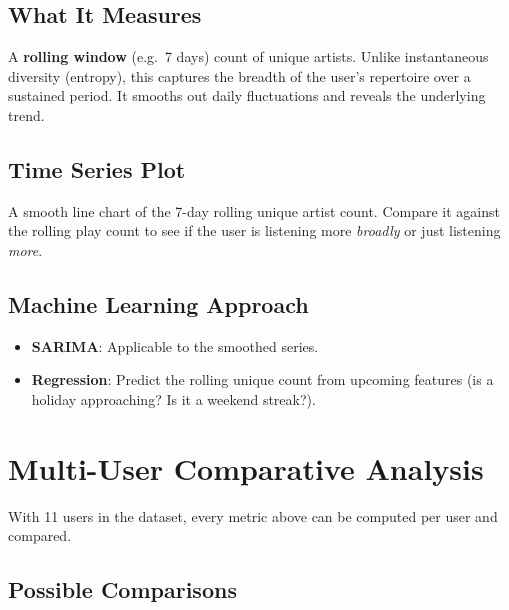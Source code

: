 \documentclass[12pt, a4paper]{article}
\begin{document}
\subsection{What It Measures}

A \textbf{rolling window} (e.g.\ 7 days) count of unique artists. Unlike
instantaneous diversity (entropy), this captures the breadth of the user's
repertoire over a sustained period. It smooths out daily fluctuations and
reveals the underlying trend.

\subsection{Time Series Plot}

A smooth line chart of the 7-day rolling unique artist count. Compare it
against the rolling play count to see if the user is listening more
\emph{broadly} or just listening \emph{more}.

\subsection{Machine Learning Approach}

\begin{itemize}
    \item \textbf{SARIMA}: Applicable to the smoothed series.
    \item \textbf{Regression}: Predict the rolling unique count from
          upcoming features (is a holiday approaching? Is it a weekend
          streak?).
\end{itemize}

\section{Multi-User Comparative Analysis}

With 11 users in the dataset, every metric above can be computed per user
and compared.

\subsection{Possible Comparisons}
\end{document}
